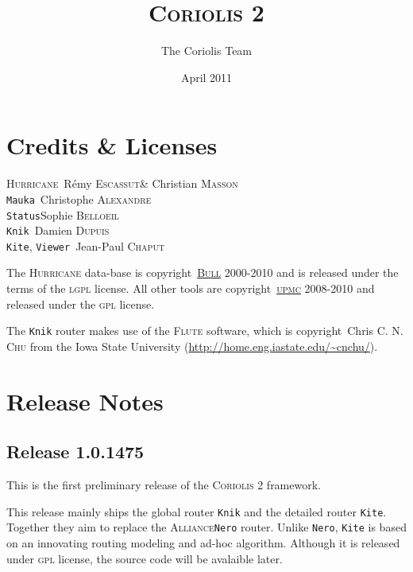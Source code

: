 \documentclass[11pt]{article}
\newcommand{\xhref}        [2]{\href{#2}{#1}}
\newcommand{\xhref}        [2]{\htmladdnormallink{#1}{#2}}
\newcommand {\Alexandre}          {\textsc{Alexandre}\xspace}
\newcommand {\Belloeil}           {\textsc{Belloeil}\xspace}
\newcommand {\Chu}                {\textsc{Chu}\xspace}
\newcommand {\Chaput}             {\textsc{Chaput}\xspace}
\newcommand {\Dupuis}             {\textsc{Dupuis}\xspace}
\newcommand {\Escassut}           {\textsc{Escassut}\xspace}
\newcommand {\Masson}             {\textsc{Masson}\xspace}
\newcommand {\LGPL}               {\textsc{lgpl}\xspace}
\newcommand {\GPL}                {\textsc{gpl}\xspace}
\newcommand {\Bull}               {\xhref{\textsc{Bull}}{http://www.bull.com/}\xspace}
\newcommand {\UPMC}               {\xhref{\textsc{upmc}}{http://www.upmc.fr/}\xspace}
\newcommand {\Flute}              {\textsc{Flute}\xspace}
\newcommand {\FluteRef}           {\xhref{http://home.eng.iastate.edu/\~{}cnchu/}%
                                      {http://home.eng.iastate.edu/~cnchu/}\xspace}
\newcommand {\Alliance}           {\textsc{Alliance}\xspace}
\newcommand {\Nero}               {\texttt{Nero}\xspace}
\newcommand {\CoriolisII}         {\textsc{Coriolis 2}\xspace}
\newcommand {\Hurricane}          {\textsc{Hurricane}\xspace}
\newcommand {\Stratus}            {\texttt{Status}\xspace}
\newcommand {\Mauka}              {\texttt{Mauka}\xspace}
\newcommand {\Knik}               {\texttt{Knik}\xspace}
\newcommand {\Kite}               {\texttt{Kite}\xspace}
\newcommand {\Viewer}             {\texttt{Viewer}\xspace}
\begin{document}
 \title{\CoriolisII}
 \author{The Coriolis Team}
 \date{April 2011}

 \maketitle

 \thispagestyle{fancy}

 \tableofcontents

 \section{Credits \& Licenses}

 \begin{center}
   \Hurricane     \dotfill\       Rémy \Escassut  \& Christian \Masson   \\
   \Mauka         \dotfill\ Christophe \Alexandre \\
   \Stratus       \dotfill      Sophie \Belloeil  \\
   \Knik          \dotfill\     Damien \Dupuis    \\
   \Kite, \Viewer \dotfill\  Jean-Paul \Chaput    \\
 \end{center}

 The \Hurricane data-base is copyright\textcopyright\ \Bull 2000-2010 and is
 released under the terms of the \LGPL license. All other tools are
 copyright\textcopyright\ \UPMC 2008-2010 and released under the \GPL
 license. 

 The \Knik router makes use of the \Flute software, which is
 copyright\textcopyright\ Chris C. N. \Chu from the Iowa State University
 (\FluteRef).

 \newpage


 \section{Release Notes}

 \subsection{Release 1.0.1475}

 This is the first preliminary release of the \CoriolisII framework.

 This release mainly ships the global router \Knik and the detailed router
 \Kite. Together they aim to replace the \Alliance \Nero router.
 Unlike \Nero, \Kite is based on an innovating routing modeling and ad-hoc
 algorithm. Although it is released under \GPL license, the source code
 will be avalaible later.
 \medskip
\end{document}
